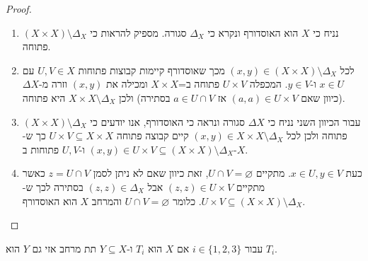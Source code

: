 \documentclass{tstextbook}
\begin{document}
\begin{proof}
  \begin{enumerate}
    \item נניח כי \(X\) הוא האוסדורף ונקרא כי \(\Delta_{X}\) סגורה. מספיק להראות כי \((X\times X)\setminus \Delta_{X}\) פתוחה.  


    \item לכל \((x,y)\in (X\times X)\setminus \Delta_{X}\) מכך שאוסדורף קיימות קבוצות פתוחות \(U,V \in X\) עם \(x \in U\) ו-\(y \in V\). המכפלה \(U\times V\) פתוחה ב=\(X \times X\) ומכילה את \((x,y)\) וזרה מ-\(\Delta X\)(כיוון שאם \((a,a)\in U\times V\) אז \(a \in U \cap V\) בסתירה) ולכן \(X \times X \setminus \Delta _X\) היא פתוחה. 


    \item עבור הכיוון השני נניח כי \(\Delta X\) סגורה ונראה כי האוסדורף, אנו יודעים כי \((X\times X)\setminus \Delta_{X}\) פתוחה ולכן לכל \((x,y )\in X\times X \setminus \Delta_{X}\) קיים קבוצה פתוחה \(U \times V \subseteq X \times X\) כך ש-\((x,y)\in U \times V\subseteq(X \times X)\setminus \Delta_{X}\) ו-\(U,V\) פתוחות ב-\(X\). 


    \item כעת \(x \in U,y \in V\). מתקיים \(U\cap V=\varnothing\), זאת כיוון שאם לא ניתן לסמן \(z = U \cap V\) כאשר מתקיים \((z,z )\in U\times V\) אבל \((z,z)\in \Delta _X\) בסתירה לכך ש-\(U\times V\subseteq (X\times X)\setminus \Delta_{X}\). כלומר \(U\cap V=\varnothing\) והמרחב \(X\) הוא האוסדורף. 


  \end{enumerate}
\end{proof}
\begin{proposition}
עבור \(i \in \{ 1,2,3 \}\) אם \(X\) הוא \(T_{i}\) ו-\(Y\subseteq X\) תת מרחב אזי גם \(Y\) הוא \(T_{i}\).

\end{proposition}
\end{document}
